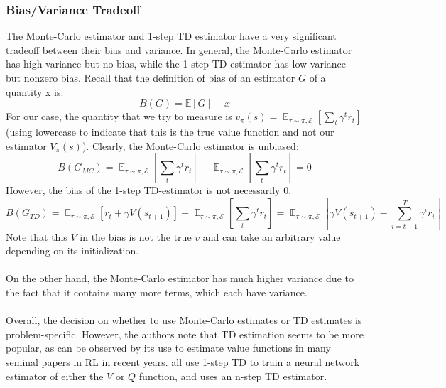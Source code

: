 \documentclass[11pt]{article}
\begin{document}
\subsubsection{Bias/Variance Tradeoff}
The Monte-Carlo estimator and 1-step TD estimator have a very significant tradeoff between their bias and variance. In general, the Monte-Carlo estimator has high variance but no bias, while the 1-step TD estimator has low variance but nonzero bias. Recall that the definition of bias of an estimator $G$ of a quantity x is:
\begin{equation}
    B(G) = \mathbb{E}[G] - x
\end{equation}
For our case, the quantity that we try to measure is $v_\pi(s) = \mathop{\mathbb{E}}_{\tau \sim \pi, \mathcal{E}}[\sum_t \gamma^t r_t]$ (using lowercase to indicate that this is the true value function and not our estimator $V_\pi(s)$). Clearly, the Monte-Carlo estimator is unbiased:
\begin{equation}
    B(G_{MC}) =\mathop{\mathbb{E}}_{\tau \sim \pi, \mathcal{E}}[\sum_t \gamma^t r_t] -  \mathop{\mathbb{E}}_{\tau \sim \pi, \mathcal{E}}[\sum_t \gamma^t r_t] = 0
\end{equation}
However, the bias of the 1-step TD-estimator is not necessarily 0.
\begin{equation}
    B(G_{TD}) =\mathop{\mathbb{E}}_{\tau \sim \pi, \mathcal{E}}[r_t + \gamma V(s_{t+1})] -  \mathop{\mathbb{E}}_{\tau \sim \pi, \mathcal{E}}[\sum_t \gamma^t r_t] = \mathop{\mathbb{E}}_{\tau \sim \pi, \mathcal{E}}[\gamma V(s_{t+1}) - \sum_{i=t+1}^T \gamma^i r_i]
\end{equation}
Note that this $V$ in the bias is not the true $v$ and can take an arbitrary value depending on its initialization. \\\\
On the other hand, the Monte-Carlo estimator has much higher variance due to the fact that it contains many more terms, which each have variance.\\\\
Overall, the decision on whether to use Monte-Carlo estimates or TD estimates is problem-specific. However, the authors note that TD estimation seems to be more popular, as can be observed by its use to estimate value functions in many seminal papers in RL in recent years. \cite{mnih2013playing, mnih2016asynchronous, lillicrap2015continuous, fujimoto2018addressing, haarnoja2018soft} all use 1-step TD to train a neural network estimator of either the $V$ or $Q$ function, and \cite{hessel2018rainbow} uses an n-step TD estimator.
\end{document}
